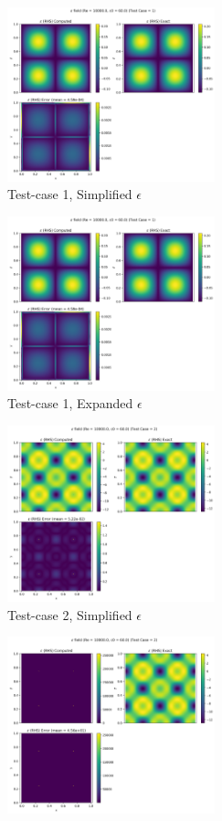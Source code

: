 \begin{figure}[H]
  \begin{subfigure}{7cm}
    \centering\includegraphics[width=6cm]{Code-Figures/keps/keps-op-conv/c0_60_ke_expd_no_ketc_1_nx_150_re_10000/eps_rhs.png}
    \caption{Test-case 1, Simplified $\epsilon$}
  \end{subfigure}
  \begin{subfigure}{7cm}
    \centering\includegraphics[width=6cm]{Code-Figures/keps/keps-op-conv/c0_60_ke_expd_yes_ketc_1_nx_150_re_10000/eps_rhs.png}
    \caption{Test-case 1, Expanded $\epsilon$}
  \end{subfigure}
  \begin{subfigure}{7cm}
    \centering\includegraphics[width=6cm]{Code-Figures/keps/keps-op-conv/c0_60_ke_expd_no_ketc_2_nx_150_re_10000/eps_rhs.png}
    \caption{Test-case 2, Simplified $\epsilon$}
  \end{subfigure}
  \begin{subfigure}{7cm}
    \centering\includegraphics[width=6cm]{Code-Figures/keps/keps-op-conv/c0_60_ke_expd_yes_ketc_2_nx_150_re_10000/eps_rhs.png}

\end{subfigure}
\end{figure}

